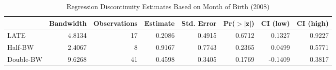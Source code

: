 \begin{table}[ht]
\centering
\begin{tabular}{lrrrrrrr}
  \hline
 & Bandwidth & Observations & Estimate & Std. Error & Pr($>$$|$z$|$) & CI (low) & CI (high) \\ 
  \hline
LATE & 4.8134 & 17 & 0.2086 & 0.4915 & 0.6712 & 0.1327 & 0.9227 \\ 
  Half-BW & 2.4067 & 8 & 0.9167 & 0.7743 & 0.2365 & 0.0499 & 0.5771 \\ 
  Double-BW & 9.6268 & 41 & 0.4598 & 0.3405 & 0.1769 & -0.1409 & 0.3817 \\ 
   \hline
\end{tabular}
\caption{Regression Discontinuity Estimates Based on Month of Birth (2008)} 
\label{tab:rd2008m1}
\end{table}
